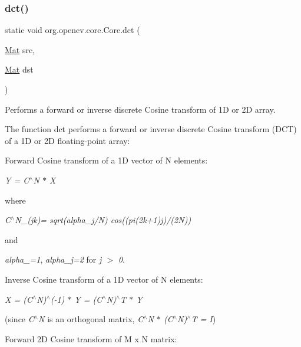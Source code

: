 \subsubsection{\texorpdfstring{dct()}{dct()}\hspace{0.1cm}{\footnotesize\ttfamily [2/2]}}
{\footnotesize\ttfamily static void org.\+opencv.\+core.\+Core.\+dct (\begin{DoxyParamCaption}\item[{\mbox{\hyperlink{classorg_1_1opencv_1_1core_1_1_mat}{Mat}}}]{src,  }\item[{\mbox{\hyperlink{classorg_1_1opencv_1_1core_1_1_mat}{Mat}}}]{dst }\end{DoxyParamCaption})\hspace{0.3cm}{\ttfamily [static]}}

Performs a forward or inverse discrete Cosine transform of 1D or 2D array.

The function {\ttfamily dct} performs a forward or inverse discrete Cosine transform (D\+CT) of a 1D or 2D floating-\/point array\+:


\begin{DoxyItemize}
\item Forward Cosine transform of a 1D vector of {\ttfamily N} elements\+: 
\end{DoxyItemize}

{\itshape Y = C$^\wedge$N $\ast$ X}

where

{\itshape C$^\wedge$\+N\+\_\+(jk)= sqrt(alpha\+\_\+j/N) cos((pi(2k+1)j)/(2N))}

and

{\itshape alpha\+\_=1}, {\itshape alpha\+\_\+j=2} for {\itshape j $>$ 0}.


\begin{DoxyItemize}
\item Inverse Cosine transform of a 1D vector of {\ttfamily N} elements\+: 
\end{DoxyItemize}

{\itshape X = (C$^\wedge$N)$^\wedge$(-\/1) $\ast$ Y = (C$^\wedge$N)$^\wedge$T $\ast$ Y}

(since {\itshape C$^\wedge$N} is an orthogonal matrix, {\itshape C$^\wedge$N $\ast$ (C$^\wedge$N)$^\wedge$T = I})


\begin{DoxyItemize}
\item Forward 2D Cosine transform of {\ttfamily M x N} matrix\+: 
\end{DoxyItemize}

